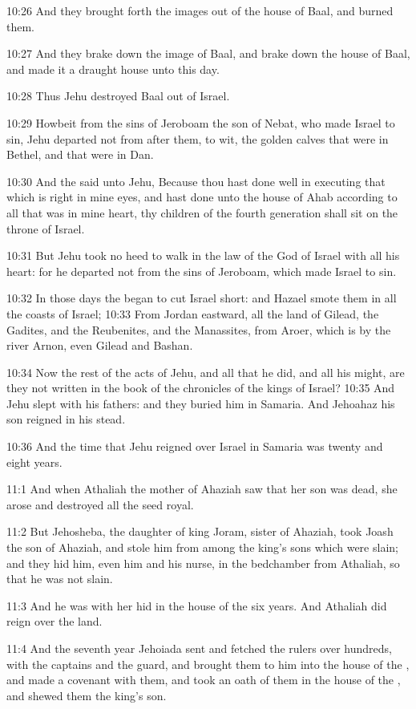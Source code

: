 10:26 And they brought forth the images out of the house of Baal, and burned them.

10:27 And they brake down the image of Baal, and brake down the house of Baal, and made it a draught house unto this day.

10:28 Thus Jehu destroyed Baal out of Israel.

10:29 Howbeit from the sins of Jeroboam the son of Nebat, who made Israel to sin, Jehu departed not from after them, to wit, the golden calves that were in Bethel, and that were in Dan.

10:30 And the \LORD said unto Jehu, Because thou hast done well in executing that which is right in mine eyes, and hast done unto the house of Ahab according to all that was in mine heart, thy children of the fourth generation shall sit on the throne of Israel.

10:31 But Jehu took no heed to walk in the law of the \LORD God of Israel with all his heart: for he departed not from the sins of Jeroboam, which made Israel to sin.

10:32 In those days the \LORD began to cut Israel short: and Hazael smote them in all the coasts of Israel; 10:33 From Jordan eastward, all the land of Gilead, the Gadites, and the Reubenites, and the Manassites, from Aroer, which is by the river Arnon, even Gilead and Bashan.

10:34 Now the rest of the acts of Jehu, and all that he did, and all his might, are they not written in the book of the chronicles of the kings of Israel?  10:35 And Jehu slept with his fathers: and they buried him in Samaria. And Jehoahaz his son reigned in his stead.

10:36 And the time that Jehu reigned over Israel in Samaria was twenty and eight years.

11:1 And when Athaliah the mother of Ahaziah saw that her son was dead, she arose and destroyed all the seed royal.

11:2 But Jehosheba, the daughter of king Joram, sister of Ahaziah, took Joash the son of Ahaziah, and stole him from among the king's sons which were slain; and they hid him, even him and his nurse, in the bedchamber from Athaliah, so that he was not slain.

11:3 And he was with her hid in the house of the \LORD six years. And Athaliah did reign over the land.

11:4 And the seventh year Jehoiada sent and fetched the rulers over hundreds, with the captains and the guard, and brought them to him into the house of the \LORD, and made a covenant with them, and took an oath of them in the house of the \LORD, and shewed them the king's son.


